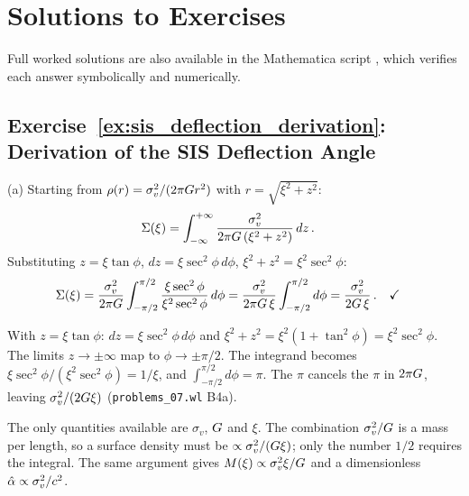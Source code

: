 
\section{Solutions to Exercises}
\label{sec:axi_solutions}

\noindent
Full worked solutions are also available in the Mathematica script
,
which verifies each answer symbolically and numerically.

\subsection*{Exercise~\ref{ex:sis_deflection_derivation}: Derivation of the SIS Deflection Angle}

(a) Starting from $\rho(r) = \sigma_v^2 / (2\pi G r^2)$
with $r = \sqrt{\xi^2 + z^2}$:
\begin{align*}
    \Sigma(\xi) &= \int_{-\infty}^{+\infty}
    \frac{\sigma_v^2}{2\pi G\,(\xi^2 + z^2)}\, dz \,.
\end{align*}
Substituting $z = \xi\tan\phi$, $dz = \xi\sec^2\phi\,d\phi$,
$\xi^2 + z^2 = \xi^2\sec^2\phi$:
\begin{align*}
    \Sigma(\xi) &= \frac{\sigma_v^2}{2\pi G}
    \int_{-\pi/2}^{\pi/2}
    \frac{\xi\sec^2\phi}{\xi^2\sec^2\phi}\, d\phi
    = \frac{\sigma_v^2}{2\pi G\,\xi}
    \int_{-\pi/2}^{\pi/2} d\phi
    = \frac{\sigma_v^2}{2G\,\xi} \,. \quad \checkmark
\end{align*}

\begin{derivation}
With $z = \xi\tan\phi$: $dz = \xi\sec^2\phi\,d\phi$ and
$\xi^2+z^2 = \xi^2(1+\tan^2\phi) = \xi^2\sec^2\phi$.  The limits
$z\to\pm\infty$ map to $\phi\to\pm\pi/2$.  The integrand becomes
$\xi\sec^2\phi/(\xi^2\sec^2\phi) = 1/\xi$, and $\int_{-\pi/2}^{\pi/2}d\phi = \pi$.
The $\pi$ cancels the $\pi$ in $2\pi G$, leaving $\sigma_v^2/(2G\xi)$
(\texttt{problems\_07.wl} B4a).
\end{derivation}

\begin{annotation}
The only quantities available are $\sigma_v$, $G$ and $\xi$.  The
combination $\sigma_v^2/G$ is a mass per length, so a surface density
must be $\propto\sigma_v^2/(G\xi)$; only the number $1/2$ requires the
integral.  The same argument gives $M(\xi)\propto\sigma_v^2\xi/G$ and a
dimensionless $\hat{\alpha}\propto\sigma_v^2/c^2$.
\end{annotation}

